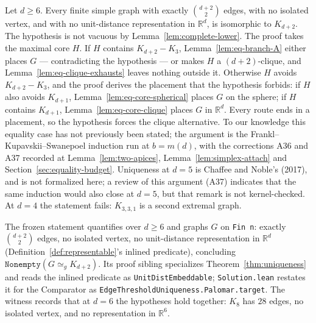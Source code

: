 \begin{theorem}
  \label{thm:uniqueness}
  \leanok
  Let $d \ge 6$. Every finite simple graph with exactly $\binom{d+2}{2}$ edges, with no
  isolated vertex, and with no unit-distance representation in $\mathbb{R}^d$, is isomorphic
  to $K_{d+2}$. The hypothesis is not vacuous by Lemma~\ref{lem:complete-lower}. The proof
  takes the maximal core $H$. If $H$ contains $K_{d+2} - K_3$, Lemma~\ref{lem:eq-branch-A}
  either places $G$ --- contradicting the hypothesis --- or makes $H$ a $(d+2)$-clique, and
  Lemma~\ref{lem:eq-clique-exhausts} leaves nothing outside it. Otherwise $H$ avoids
  $K_{d+2} - K_3$, and the proof derives the placement that the hypothesis forbids: if $H$
  also avoids $K_{d+1}$, Lemma~\ref{lem:eq-core-spherical} places $G$ on the sphere; if
  $H$ contains $K_{d+1}$, Lemma~\ref{lem:eq-core-clique} places $G$ in $\mathbb{R}^d$.
  Every
  route ends in a placement, so the hypothesis forces the clique alternative. To our
  knowledge this equality case has not previously been stated; the argument is the
  Frankl--Kupavskii--Swanepoel induction run at $b = m(d)$, with the corrections A36 and
  A37 recorded at Lemma~\ref{lem:two-apices}, Lemma~\ref{lem:simplex-attach} and
  Section~\ref{sec:equality-budget}. Uniqueness at $d = 5$ is Chaffee and Noble's (2017),
  and is not formalized here; a review of this argument (A37) indicates that the same induction
  would also close at $d = 5$, but that remark is not kernel-checked. At $d = 4$ the statement
  fails: $K_{3,3,1}$ is a second extremal graph.
\end{theorem}

\begin{theorem}
  \label{thm:palomar}
  \leanok
  The frozen statement quantifies over $d \ge 6$ and graphs $G$ on \texttt{Fin n}: exactly
  $\binom{d+2}{2}$ edges, no isolated vertex, no unit-distance representation in
  $\mathbb{R}^d$ (Definition~\ref{def:representable}'s inlined predicate), concluding
  $\texttt{Nonempty} (G \simeq_g K_{d+2})$. Its proof sibling specializes
  Theorem~\ref{thm:uniqueness} and reads the inlined predicate as
  \texttt{UnitDistEmbeddable}; \texttt{Solution.lean} restates it for the Comparator as
  \texttt{EdgeThresholdUniqueness.Palomar.target}. The witness records that at $d = 6$ the
  hypotheses hold together: $K_8$ has $28$ edges, no isolated vertex, and no representation
  in $\mathbb{R}^6$.
\end{theorem}
